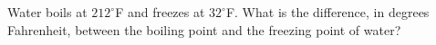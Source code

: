Water boils at $212^\circ$F and freezes at $32^\circ$F. What is the difference, in degrees Fahrenheit, between the boiling point and the freezing point of water?
